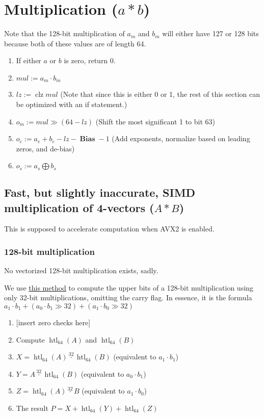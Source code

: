 \documentclass[12pt]{article}
\DeclareMathOperator{\bias}{\textbf{Bias}}
\DeclareMathOperator{\htl}{htl}
\DeclareMathOperator{\clz}{clz}
\begin{document}
    \section{Multiplication ($a * b$)}\label{sec:multiplication}

    Note that the 128-bit multiplication of $a_m$ and $b_m$ will either have 127 or 128 bits because both of these values are of length 64.

    \begin{enumerate}
        \item If either $a$ or $b$ is zero, return 0.
        \item $mul := a_m \cdot b_m$
        \item $lz := \clz mul$ (Note that since this is either 0 or 1, the rest of this section can be optimized with an if statement.)
        \item $o_m := mul \gg (64 - lz)$ (Shift the most significant 1 to bit 63)
        \item $o_e := a_e + b_e - lz - \bias - 1$ (Add exponents, normalize based on leading zeros, and de-bias)
        \item $o_s := a_s \bigoplus b_s$
    \end{enumerate}

    \subsection{Fast, but slightly inaccurate, SIMD multiplication of 4-vectors ($A * B$)}\label{subsec:multiplication-simd}

    This is supposed to accelerate computation when AVX2 is enabled.

    \subsubsection{128-bit multiplication}

    No vectorized 128-bit multiplication exists, sadly.

    We use \href{https://stackoverflow.com/a/28904636/12947037}{this method} to compute the upper bits of a 128-bit multiplication using only 32-bit multiplications, omitting the carry flag.
    In essence, it is the formula $a_1 \cdot b_1 + (a_0 \cdot b_1 \gg 32) + (a_1 \cdot b_0 \gg 32)$

    \begin{enumerate}
        \item {[insert zero checks here]}
        \item Compute $\htl_{64}(A)$ and $\htl_{64}(B)$
        \item $X = \htl_{64}(A) \stackrel{32}{\cdot} \htl_{64}(B)$ (equivalent to $a_1 \cdot b_1$)
        \item $Y = A \stackrel{32}{\cdot} \htl_{64}(B)$ (equivalent to $a_0 \cdot b_1$)
        \item $Z = \htl_{64}(A) \stackrel{32}{\cdot} B$ (equivalent to $a_1 \cdot b_0$)
        \item The result $P = X + \htl_{64}(Y) + \htl_{64}(Z)$
    \end{enumerate}
\end{document}
